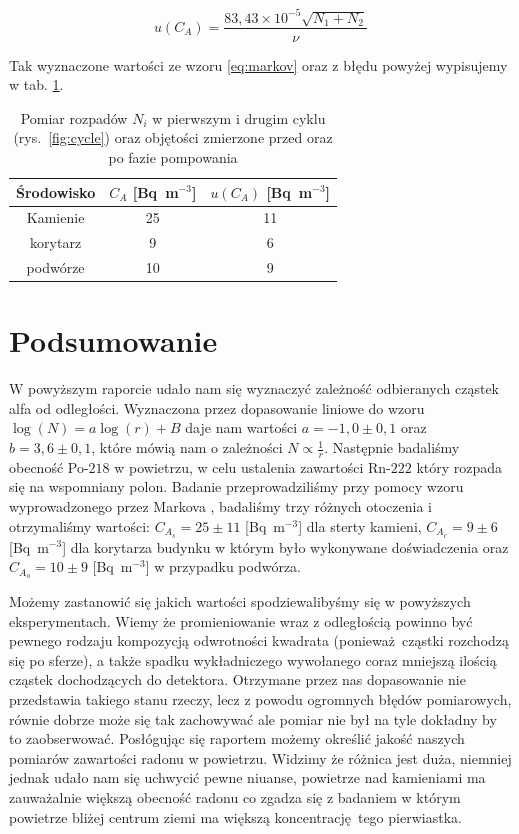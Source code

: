 \documentclass[12pt]{article}
\begin{document}
\[
	u(C_A) = \frac{83{,}43 \times 10^{-5} \sqrt{N_1 + N_2}}{\nu}
\]

Tak wyznaczone wartości ze wzoru \eqref{eq:markov} oraz z błędu powyżej wypisujemy w tab. \ref{tab:concentration_results}.

\begin{table}[H]
    \centering
    \begin{tabular}{c|cc}
        \toprule
        Środowisko & $C_A$ [Bq~m$^{-3}$] & $u(C_A)$ [Bq~m$^{-3}$] \\ 
        \midrule
        Kamienie & 25 & 11 \\
        korytarz & 9  & 6 \\
        podwórze & 10  & 9 \\
        \bottomrule
    \end{tabular}
    \caption{Pomiar rozpadów $N_i$ w pierwszym i drugim cyklu (rys.~\ref{fig:cycle}) oraz objętości zmierzone przed oraz po fazie pompowania}
    \label{tab:concentration_results}
\end{table}

\section{Podsumowanie}
W powyższym raporcie udało nam się wyznaczyć zależność odbieranych cząstek alfa od odległości. Wyznaczona przez dopasowanie liniowe do wzoru $\log(N) = a \log(r) + B$ daje nam wartości $a = -1{,}0 \pm 0{,}1$ oraz $b = 3{,}6 \pm 0{,}1$, które mówią nam o zależności $N \propto \frac{1}{r}$.
Następnie badaliśmy obecność Po-$218$ w powietrzu, w celu ustalenia zawartości Rn-$222$ który rozpada się na wspomniany polon. Badanie przeprowadziliśmy przy pomocy wzoru wyprowadzonego przez Markova \cite{equation}, badaliśmy trzy różnych otoczenia i otrzymaliśmy wartości: $C_{A_s} = 25 \pm 11$ [Bq~m$^{-3}$] dla sterty kamieni,
$C_{A_c} = 9 \pm 6$ [Bq~m$^{-3}$] dla korytarza budynku w którym było wykonywane doświadczenia oraz $C_{A_o} = 10 \pm 9$ [Bq~m$^{-3}$] w przypadku podwórza.

Możemy zastanowić się jakich wartości spodziewalibyśmy się w powyższych eksperymentach. Wiemy że promieniowanie wraz z odległością powinno być pewnego rodzaju kompozycją odwrotności kwadrata (ponieważ cząstki rozchodzą się po sferze), a także spadku wykładniczego wywołanego coraz mniejszą ilością cząstek dochodzących do detektora. Otrzymane przez nas dopasowanie nie przedstawia takiego stanu rzeczy, lecz z powodu ogromnych błędów pomiarowych, równie dobrze może się tak zachowywać ale pomiar nie był na tyle dokładny by to zaobserwować. Posłógując się raportem \cite{concentration} możemy określić jakość naszych pomiarów zawartości radonu w powietrzu. Widzimy że różnica jest duża, niemniej jednak udało nam się uchwycić pewne niuanse, powietrze nad kamieniami ma zauważalnie większą obecność radonu co zgadza się z badaniem w którym powietrze bliżej centrum ziemi ma większą koncentrację tego pierwiastka.
\end{document}
